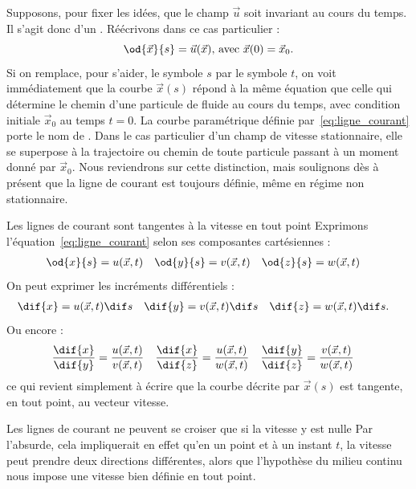 Supposons, pour fixer les idées, que le champ $\vec{u}$ soit invariant au cours du temps. Il s'agit donc d'un . Réécrivons dans ce cas particulier :
\begin{displaymath}
  \od{\vec{x}}{s} = \vec{u}(\vec{x})\text{, avec $\vec{x}(0)=\vec{x}_0$}.
\end{displaymath}
Si on remplace, pour s'aider, le symbole $s$ par le symbole $t$, on voit immédiatement que la courbe $\vec{x}(s)$ répond à la même équation que celle qui détermine le chemin d'une particule de fluide au cours du temps, avec condition initiale $\vec{x}_0$ au temps $t=0$.
La courbe paramétrique définie par~\eqref{eq:ligne_courant} porte le nom de . Dans le cas particulier d'un champ de vitesse stationnaire, elle se superpose à la trajectoire ou chemin de toute particule passant à un moment donné par $\vec{x}_0$. Nous reviendrons sur cette distinction, mais soulignons dès à présent que la ligne de courant est toujours définie, même en régime non stationnaire.

\begin{key}{Les lignes de courant sont tangentes à la vitesse en tout point}
Exprimons l'équation~\eqref{eq:ligne_courant} selon ses composantes cartésiennes :
\begin{align*}
  \od{{x}}{s} &= u(\vec{x},t) &
  \od{{y}}{s} &= v(\vec{x},t) &
  \od{{z}}{s} &= w(\vec{x},t)
\end{align*}
On peut exprimer les incréments différentiels :
\begin{align*}
  \dif{x} &= u(\vec{x},t) \dif s &
  \dif{y} &= v(\vec{x},t) \dif s &
  \dif{z} &= w(\vec{x},t) \dif s.
\end{align*}
Ou encore :
\begin{align*}
  \frac{\dif{x}}{\dif{y}}  &= \frac{u(\vec{x},t)}{v(\vec{x},t)} &
  \frac{\dif{x}}{\dif{z}}  &= \frac{u(\vec{x},t)}{w(\vec{x},t)} &
  \frac{\dif{y}}{\dif{z}}  &= \frac{v(\vec{x},t)}{w(\vec{x},t)}
\end{align*}
ce qui revient simplement à écrire que la courbe décrite par $\vec{x}(s)$ est tangente, en tout point, au vecteur vitesse.
\end{key}

\begin{key}{Les lignes de courant ne peuvent se croiser que si la vitesse y est nulle}
Par l'absurde, cela impliquerait en effet qu'en un point et à un instant $t$, la vitesse peut prendre deux directions différentes, alors que l'hypothèse du milieu continu nous impose une vitesse bien définie en tout point.
\end{key}

